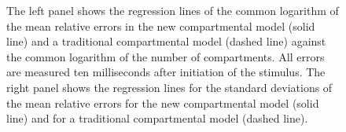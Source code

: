 \begin{figure}[!h]
\centering
\parbox{5.2in}{\caption{\label{mean} The left panel shows the
regression lines of the common logarithm of the mean relative
errors in the new compartmental model (solid line) and a
traditional compartmental model (dashed line) against the common
logarithm of the number of compartments. All errors are measured
ten milliseconds after initiation of the stimulus. The right panel
shows the regression lines for the standard deviations of the mean
relative errors for the new compartmental model (solid line) and
for a traditional compartmental model (dashed line).}}
\end{figure}

